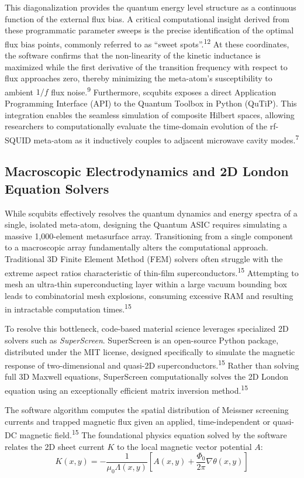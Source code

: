 \documentclass[11pt, a4paper]{article}
\begin{document}
This diagonalization provides the quantum energy level structure as a continuous function of the external flux bias. A critical computational insight derived from these programmatic parameter sweeps is the precise identification of the optimal flux bias points, commonly referred to as ``sweet spots''.\textsuperscript{12} At these coordinates, the software confirms that the non-linearity of the kinetic inductance is maximized while the first derivative of the transition frequency with respect to flux approaches zero, thereby minimizing the meta-atom's susceptibility to ambient $1/f$ flux noise.\textsuperscript{9} Furthermore, scqubits exposes a direct Application Programming Interface (API) to the Quantum Toolbox in Python (QuTiP). This integration enables the seamless simulation of composite Hilbert spaces, allowing researchers to computationally evaluate the time-domain evolution of the rf-SQUID meta-atom as it inductively couples to adjacent microwave cavity modes.\textsuperscript{7}

\subsection{Macroscopic Electrodynamics and 2D London Equation Solvers}

While scqubits effectively resolves the quantum dynamics and energy spectra of a single, isolated meta-atom, designing the Quantum ASIC requires simulating a massive 1,000-element metasurface array. Transitioning from a single component to a macroscopic array fundamentally alters the computational approach. Traditional 3D Finite Element Method (FEM) solvers often struggle with the extreme aspect ratios characteristic of thin-film superconductors.\textsuperscript{15} Attempting to mesh an ultra-thin superconducting layer within a large vacuum bounding box leads to combinatorial mesh explosions, consuming excessive RAM and resulting in intractable computation times.\textsuperscript{15}

To resolve this bottleneck, code-based material science leverages specialized 2D solvers such as \textit{SuperScreen}. SuperScreen is an open-source Python package, distributed under the MIT license, designed specifically to simulate the magnetic response of two-dimensional and quasi-2D superconductors.\textsuperscript{15} Rather than solving full 3D Maxwell equations, SuperScreen computationally solves the 2D London equation using an exceptionally efficient matrix inversion method.\textsuperscript{15}

The software algorithm computes the spatial distribution of Meissner screening currents and trapped magnetic flux given an applied, time-independent or quasi-DC magnetic field.\textsuperscript{15} The foundational physics equation solved by the software relates the 2D sheet current $K$ to the local magnetic vector potential $A$:
\begin{equation}
K(x,y) = -\frac{1}{\mu_0 \Lambda(x,y)} \left[ A(x,y) + \frac{\Phi_0}{2\pi} \nabla\theta(x,y) \right]
\end{equation}
\end{document}
